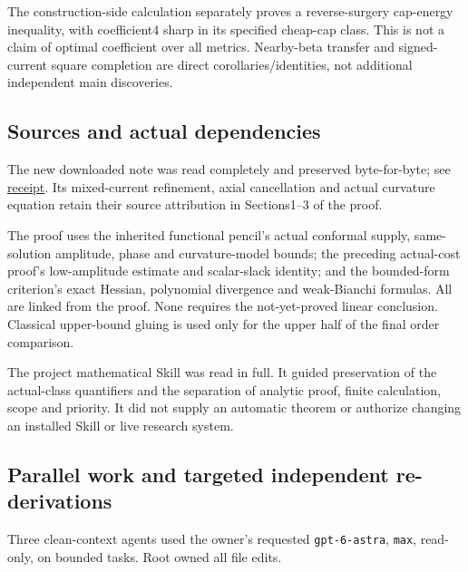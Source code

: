 \documentclass[
  10pt,
]{article}
\begin{document}
The construction-side calculation separately proves a reverse-surgery
cap-energy inequality, with coefficient4 sharp in its specified
cheap-cap class. This is not a claim of optimal coefficient over all
metrics. Nearby-beta transfer and signed-current square completion are
direct corollaries/identities, not additional independent main
discoveries.

\hypertarget{sources-and-actual-dependencies}{%
\subsection{Sources and actual
dependencies}\label{sources-and-actual-dependencies}}

The new downloaded note was read completely and preserved byte-for-byte;
see
\href{../guidance/source/20260927_mixed_current_receipt.json}{receipt}.
Its mixed-current refinement, axial cancellation and actual curvature
equation retain their source attribution in Sections1--3 of the proof.

The proof uses the inherited functional pencil's actual conformal
supply, same-solution amplitude, phase and curvature-model bounds; the
preceding actual-cost proof's low-amplitude estimate and scalar-slack
identity; and the bounded-form criterion's exact Hessian, polynomial
divergence and weak-Bianchi formulas. All are linked from the proof.
None requires the not-yet-proved linear conclusion. Classical
upper-bound gluing is used only for the upper half of the final order
comparison.

The project mathematical Skill was read in full. It guided preservation
of the actual-class quantifiers and the separation of analytic proof,
finite calculation, scope and priority. It did not supply an automatic
theorem or authorize changing an installed Skill or live research
system.

\hypertarget{parallel-work-and-targeted-independent-re-derivations}{%
\subsection{Parallel work and targeted independent
re-derivations}\label{parallel-work-and-targeted-independent-re-derivations}}

Three clean-context agents used the owner's requested
\texttt{gpt-6-astra}, \texttt{max}, read-only, on bounded tasks. Root
owned all file edits.
\end{document}
